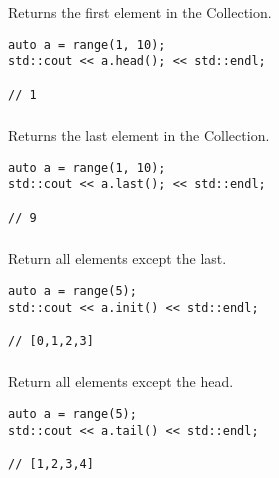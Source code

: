 Returns the first element in the Collection.

\begin{lstlisting}[title=example]
auto a = range(1, 10);
std::cout << a.head(); << std::endl;

// 1
\end{lstlisting}




\subsubsection{}

Returns the last element in the Collection.

\begin{lstlisting}[title=example]
auto a = range(1, 10);
std::cout << a.last(); << std::endl;

// 9
\end{lstlisting}




\subsubsection{}

Return all elements except the last.

\begin{lstlisting}[title=example]
auto a = range(5);
std::cout << a.init() << std::endl;

// [0,1,2,3]
\end{lstlisting}




\subsubsection{}

Return all elements except the head.

\begin{lstlisting}[title=example]
auto a = range(5);
std::cout << a.tail() << std::endl;

// [1,2,3,4]
\end{lstlisting}




\subsubsection{}

